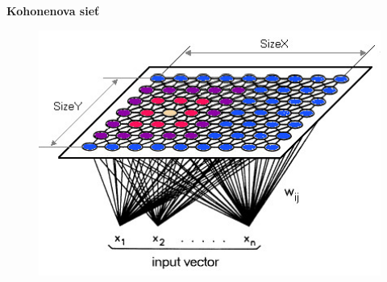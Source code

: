\documentclass[xcolor=dvipsnames]{beamer}
\begin{document}
\begin{frame}{\bf Kohonenova sieť}

\begin{figure}[ht]
\begin{center}
\begin{minipage}{0.6\linewidth}
\begin{center}
\includegraphics[width=1.0\textwidth]{images/kohonen.jpg}
\end{center}
\end{minipage}
\end{center}
\end{figure}

\end{frame}
\end{document}
